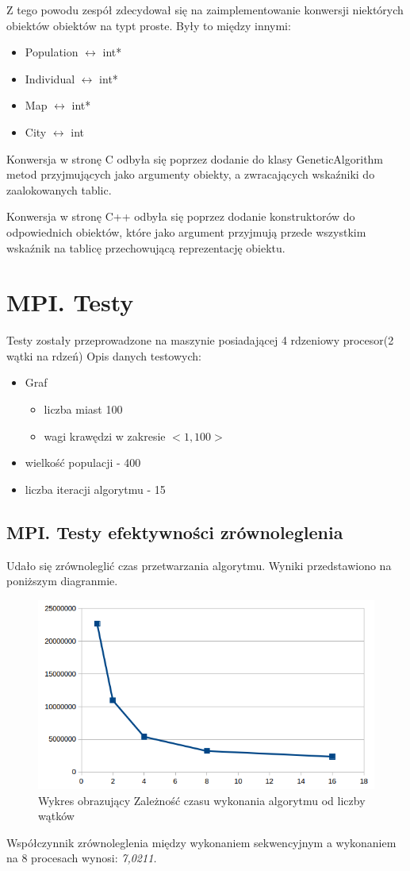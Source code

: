 \documentclass[10pt,a4paper]{article}
\begin{document}
Z tego powodu zespół zdecydował się na zaimplementowanie konwersji niektórych obiektów obiektów na typt proste. Były to między innymi:
\begin{itemize}
\item Population $\leftrightarrow$ int*
\item Individual $\leftrightarrow$ int*
\item Map $\leftrightarrow$ int*
\item City $\leftrightarrow$ int
\end{itemize} 

Konwersja w stronę C odbyła się poprzez dodanie do klasy GeneticAlgorithm metod przyjmujących jako argumenty obiekty, a zwracających wskaźniki do zaalokowanych tablic.

Konwersja w stronę C++ odbyła się poprzez dodanie konstruktorów do odpowiednich obiektów, które jako argument przyjmują przede wszystkim wskaźnik na tablicę przechowującą reprezentację obiektu.

\section{MPI. Testy}
Testy zostały przeprowadzone na maszynie posiadającej 4 rdzeniowy procesor(2 wątki na rdzeń)
Opis danych testowych:
\begin{itemize}\label{opisGrafu}
\item Graf
\begin{itemize}
\item liczba miast 100 
\item wagi krawędzi w zakresie $<1,100>$
\end{itemize} 
\item wielkość populacji - 400
\item liczba iteracji algorytmu - 15
\end{itemize} 
\subsection{MPI. Testy efektywności zrównoleglenia}
Udało się zrównoleglić czas  przetwarzania algorytmu. Wyniki przedstawiono na poniższym diagranmie.

\begin{figure}[H]
\includegraphics[scale=0.8]{mpi_wykr.png}
\centering
\caption{\label{wykr:Mpi}Wykres obrazujący Zależność czasu wykonania algorytmu od liczby wątków}
\end{figure}
Współczynnik zrównoleglenia między wykonaniem sekwencyjnym  a wykonaniem na 8 procesach wynosi:\textit{ 7,0211.}
\pagebreak
\end{document}
